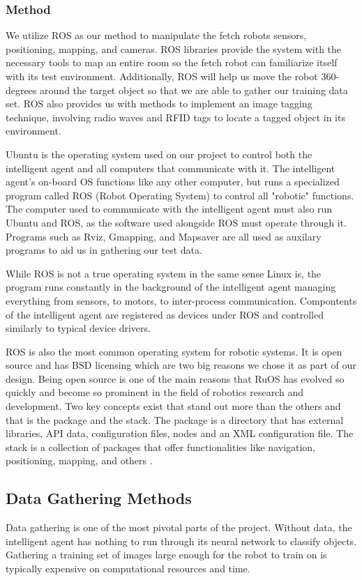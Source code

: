 \documentclass[draftclsnofoot, onecolumn, 10pt, compsoc]{IEEEtran}
\begin{document}
			\subsubsection{Method}
				We utilize ROS as our method to manipulate the fetch robots sensors, positioning, mapping, and cameras. ROS libraries provide the system with the necessary tools to map an entire room so the fetch robot can familiarize itself with its test environment. Additionally, ROS will help us move the robot 360-degrees around the target object so that we are able to gather our training data set. ROS also provides us with methods to implement an image tagging technique, involving radio waves and RFID tags to locate a tagged object in its environment.

				Ubuntu is the operating system used on our project to control both the intelligent agent and all computers that communicate with it. The intelligent agent's on-board OS functions like any other computer, but runs a specialized program called ROS (Robot Operating System) to control all "robotic" functions. The computer used to communicate with the intelligent agent must also run Ubuntu and ROS, as the software used alongside ROS must operate through it. Programs such as Rviz, Gmapping, and Mapsaver are all used as auxilary programs to aid us in gathering our test data.

				While ROS is not a true operating system in the same sense Linux is, the program runs constantly in the background of the intelligent agent managing everything from sensors, to motors, to inter-process communication. Compontents of the intelligent agent are registered as devices under ROS and controlled similarly to typical device drivers.

				ROS is also the most common operating system for robotic systems. It is open source and has BSD licensing which are two big reasons we chose it as part of our design. Being open source is one of the main reasons that RuOS has evolved so quickly and become so prominent in the field of robotics research and development. Two key concepts exist that stand out more than the others and that is the package and the stack. The package is a directory that has external libraries, API data, configuration files, nodes and an XML configuration file. The stack is a collection of packages that offer functionalities like navigation, positioning, mapping, and others \cite{ROSintro}.

		\subsection{Data Gathering Methods}
			Data gathering is one of the most pivotal parts of the project. Without data, the intelligent agent has nothing to run through its neural network to classify objects. Gathering a training set of images large enough for the robot to train on is typically expensive on computational resources and time.
\end{document}
